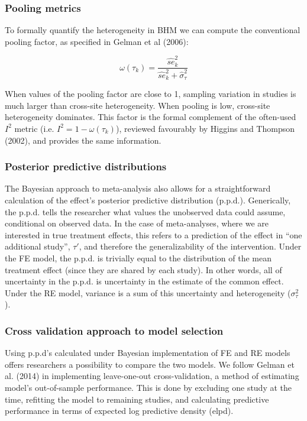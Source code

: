\documentclass[12pt]{article}
\begin{document}
\subsubsection*{Pooling metrics}

To formally quantify the heterogeneity in BHM we can compute the conventional pooling factor, as specified in Gelman et al (2006):

\begin{equation}
\omega(\tau_k) = \frac{\hat{se}^2_k }{\hat{se}^2_k + \hat{\sigma}_{\tau}^2 }
\end{equation}

When values of the pooling factor are close to 1, sampling variation in studies is much larger than cross-site heterogeneity. When pooling is low, cross-site heterogeneity dominates. This factor is the formal complement of the often-used $I^2$ metric (i.e. $I^2 = 1- \omega(\tau_k)$), reviewed favourably by Higgins and Thompson (2002), and provides the same information. 


\subsubsection*{Posterior predictive distributions}

The Bayesian approach to meta-analysis also allows for a straightforward calculation of the effect's posterior predictive distribution (p.p.d.). Generically, the p.p.d. tells the researcher what values the unobserved data could assume, conditional on observed data. In the case of meta-analyses, where we are interested in true treatment effects, this refers to a prediction of the effect in ``one additional study'', $\tau'$, and therefore the generalizability of the intervention. Under the FE model, the p.p.d. is trivially equal to the distribution of the mean treatment effect (since they are shared by each study). In other words, all of uncertainty in the p.p.d. is uncertainty in the estimate of the common effect. Under the RE model, variance is a sum of this uncertainty and heterogeneity ($\sigma_\tau^2$). 

\subsubsection*{Cross validation approach to model selection}

Using p.p.d's calculated under Bayesian implementation of FE and RE models offers researchers a possibility to compare the two models. We follow Gelman et al. (2014) in implementing leave-one-out cross-validation, a method of estimating model's out-of-sample performance. This is done by excluding one study at the time, refitting the model to remaining studies, and calculating predictive performance in terms of expected log predictive density (elpd).
\end{document}
